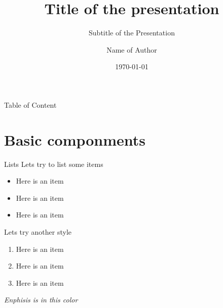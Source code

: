 \documentclass{libs/SUSTech_format}
\title[short title of the pre]{\huge\textbf{Title of the presentation}}
\subtitle{Subtitle of the Presentation}
\author{Name of Author}
\institute[SUSTech]{
    \normalsize{\email{name@mail.sustech.edu.cn}}
    \newline
    \department{Name of the Department}
    \newline
    \SUSTech
}
\date{\today}
\begin{document}


\begin{frame}{}
    \maketitle
\end{frame}

\begin{frame}{Table of Content}
    \begin{multicols}{2}
        \tableofcontents
    \end{multicols}
\end{frame}

\section{Basic componments}

\begin{frame}{Lists}
    Lets try to list some items
    \begin{itemize}
        \item Here is an item\cite{einstein}
        \item Here is an item\cite{siteufc}
        \item Here is an item
    \end{itemize}

    \vspace{0.4cm} %
    
    Lets try another style
    \begin{enumerate}
        \item Here is an item
        \item Here is an item
        \item Here is an item
    \end{enumerate}

    \vspace{0.2cm}

     \emph{Enphisis is in this color}
\end{frame}
\end{document}
